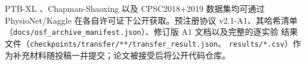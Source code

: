 
PTB-XL \cite{wagner2020ptbxl}、Chapman-Shaoxing
\cite{zheng2022ecgarrhythmia} 以及 CPSC2018+2019 数据集均可通过
PhysioNet/Kaggle 在各自许可证下公开获取。预注册协议 v2.1-A1、其哈希清单
（\texttt{docs/osf\_archive\_manifest.json}）、修订版 A1 文档以及完整的逐实验
结果文件（\texttt{checkpoints/transfer/**/}\allowbreak\texttt{transfer\_result.json}、
\texttt{results/*.csv}）作为补充材料随投稿一并提交；论文被接受后将公开代码仓库。
